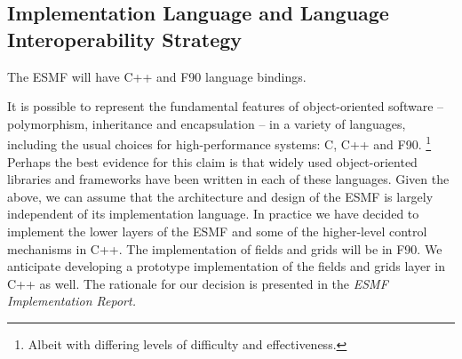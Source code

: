 \subsection{Implementation Language and Language Interoperability Strategy}

The ESMF will have C++ and F90 language bindings.

It is possible to represent the fundamental features of object-oriented 
software -- polymorphism, inheritance and encapsulation -- in a variety of languages, 
including the usual choices for high-performance systems: C, C++ and F90. \footnote{Albeit 
with differing levels of difficulty and effectiveness.}  Perhaps the best evidence for 
this claim is that widely used object-oriented libraries and frameworks have been 
written in each of these languages.  Given the above, we can assume that the architecture 
and design of the ESMF is largely independent of its implementation language.  
In practice we have decided to implement the lower layers 
of the ESMF and some of the higher-level control mechanisms in C++.  The
implementation of fields and grids will be in F90.  We anticipate developing a 
prototype implementation of the fields and grids layer in C++ as well.
The rationale for our decision is presented in the {\it ESMF Implementation Report.}





